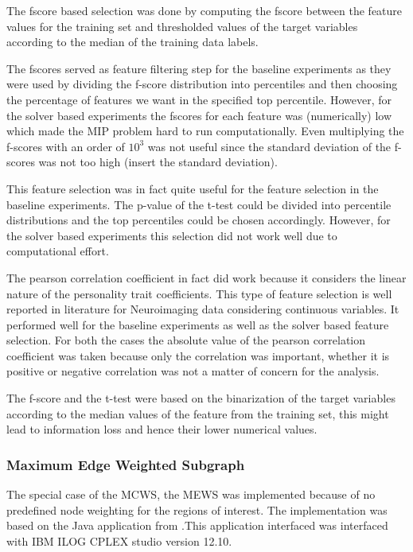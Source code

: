 \documentclass[msthesis.tex]{subfiles}
\begin{document}
The fscore based selection was done by computing the fscore between the feature values for the training set and thresholded values of the target variables according to the median of the training data labels. 

The fscores served as feature filtering step for the baseline experiments as they were used by dividing the f-score distribution into percentiles and then choosing the percentage of features we want in the specified top percentile. However, for the solver based experiments the fscores for each feature was (numerically) low which made the MIP problem hard to run computationally. Even multiplying the f-scores with an order of $10^3$ was not useful since the standard deviation of the f-scores was not too high (insert the standard deviation). 

This feature selection was in fact quite useful for the feature selection in the baseline experiments. The p-value of the t-test could be divided into percentile distributions and the top percentiles could be chosen accordingly. However, for the solver based experiments this selection did not work well due to computational effort. 

The pearson correlation coefficient in fact did work because it considers the linear nature of the personality trait coefficients. This type of feature selection is well reported in literature for Neuroimaging data considering continuous variables. It performed well for the baseline experiments as well as the solver based feature selection. For both the cases the absolute value of the pearson correlation coefficient was taken because only the correlation was important, whether it is positive or negative correlation was not a matter of concern for the analysis.

The f-score and the t-test were based on the binarization of the target variables according to the median values of the feature from the training set, this might lead to information loss and hence their lower numerical values. 
\fi

\subsubsection{Maximum Edge Weighted Subgraph}
\label{method:MEWS}

The special case of the MCWS, the MEWS was implemented because of no predefined node weighting for the regions of interest. The implementation was based on  the Java application from \cite{DBLP:journals/corr/LobodaAS16}.This application interfaced was interfaced with IBM ILOG CPLEX studio version 12.10.
\end{document}
